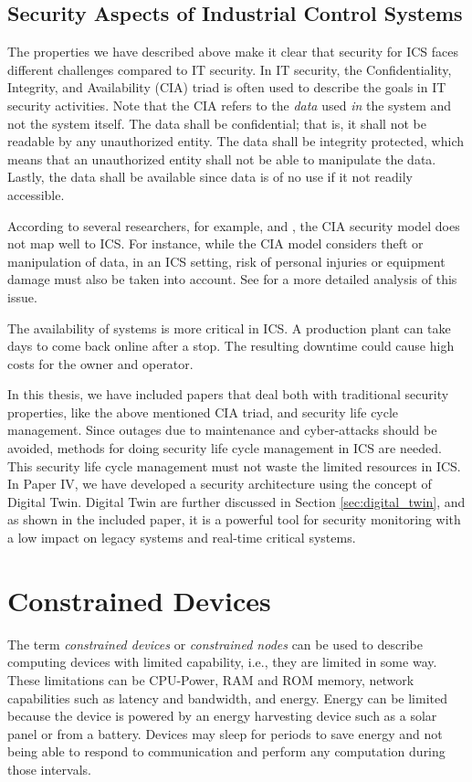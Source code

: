 \subsection{Security Aspects of Industrial Control Systems}
\label{subsec:ics_security}
The properties we have described above make it clear that security for ICS faces different challenges compared to IT security. In IT security, the Confidentiality, Integrity, and Availability (CIA) triad is often used \cite{perrin2008cia} to describe the goals in IT security activities. Note that the CIA refers to the \emph{data} used \emph{in} the system and not the system itself.
The data shall be confidential; that is, it shall not be readable by any unauthorized entity. The data shall be integrity protected, which means that an unauthorized entity shall not be able to manipulate the data. Lastly, the data shall be available since data is of no use if it not readily accessible. 

According to several researchers, for example, \cite{Gollmann2016} and \cite{stouffer2011sp}, the CIA security model does not map well to ICS. For instance, while the CIA model considers theft or manipulation of data, in an ICS setting, risk of personal injuries or equipment damage must also be taken into account. See \cite{stouffer2011sp} for a more detailed analysis of this issue.

The availability of systems is more critical in ICS. A production plant can take days to come back online after a stop. The resulting downtime could cause high costs for the owner and operator. 

In this thesis, we have included papers that deal both with traditional security properties, like the above mentioned CIA triad, and security life cycle management. Since outages due to maintenance and cyber-attacks should be avoided, methods for doing security life cycle management in ICS are needed. This security life cycle management must not waste the limited resources in ICS. In Paper IV, we have developed a security architecture using the concept of Digital Twin. Digital Twin are further discussed in Section \ref{sec:digital_twin}, and as shown in the included paper, it is a powerful tool for security monitoring with a low impact on legacy systems and real-time critical systems.

\section{Constrained Devices}
\label{sec:constrained_devices}
The term \emph{constrained devices} or \emph{constrained nodes} can be used to describe computing devices with limited capability, i.e., they are limited in some way. These limitations can be CPU-Power, RAM and ROM memory, network capabilities such as latency and bandwidth, and energy. Energy can be limited because the device is powered by an energy harvesting device such as a solar panel or from a battery. Devices may sleep for periods to save energy and not being able to respond to communication and perform any computation during those intervals.

